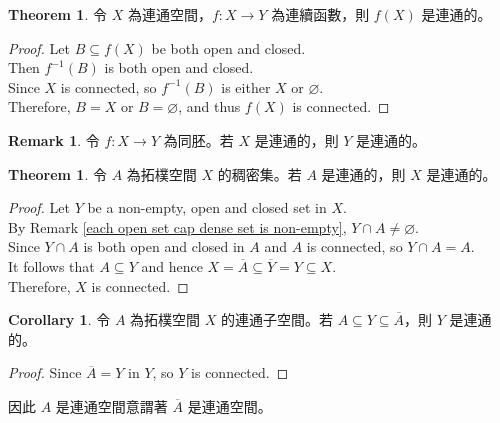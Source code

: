 \documentclass[12pt]{article}
\theoremstyle{definition}
\newtheorem{theorem}[definition]{Theorem}
\newtheorem{remark}[definition]{Remark}
\newtheorem{corollary}[definition]{Corollary}
\newcommand\<{\langle}
\renewcommand\>{\rangle}
\begin{document}
\begin{CJK}{UTF8}{bsmi}
\begin{theorem}
    令 $X$ 為連通空間，$f:X\to Y$ 為連續函數，則 $f(X)$ 是連通的。
\end{theorem}
\begin{proof}
    Let $B\subseteq f(X)$ be both open and closed. \\
    Then $f^{-1}(B)$ is both open and closed. \\
    Since $X$ is connected, so $f^{-1}(B)$ is either $X$ or $\varnothing$. \\
    Therefore, $B=X$ or $B=\varnothing$, and thus $f(X)$ is connected.
\end{proof}

\begin{remark}
    令 $f:X\to Y$ 為同胚。若 $X$ 是連通的，則 $Y$ 是連通的。
\end{remark}

\begin{theorem}
    令 $A$ 為拓樸空間 $X$ 的稠密集。若 $A$ 是連通的，則 $X$ 是連通的。
\end{theorem}
\begin{proof}
    Let $Y$ be a non-empty, open and closed set in $X$. \\
    By Remark \ref{each open set cap dense set is non-empty}, $Y\cap A\ne\varnothing$. \\
    Since $Y\cap A$ is both open and closed in $A$ and $A$ is connected, so $Y\cap A=A$. \\
    It follows that $A\subseteq Y$ and hence $X=\overline{A}\subseteq\overline{Y}=Y\subseteq X$. \\
    Therefore, $X$ is connected.
\end{proof}

\begin{corollary}
    令 $A$ 為拓樸空間 $X$ 的連通子空間。若 $A\subseteq Y\subseteq\overline{A}$，則 $Y$ 是連通的。
\end{corollary}
\begin{proof}
    Since $\overline{A}=Y$ in $Y$, so $Y$ is connected.
\end{proof}

因此 $A$ 是連通空間意謂著 $\overline{A}$ 是連通空間。


\end{CJK}
\end{document}
